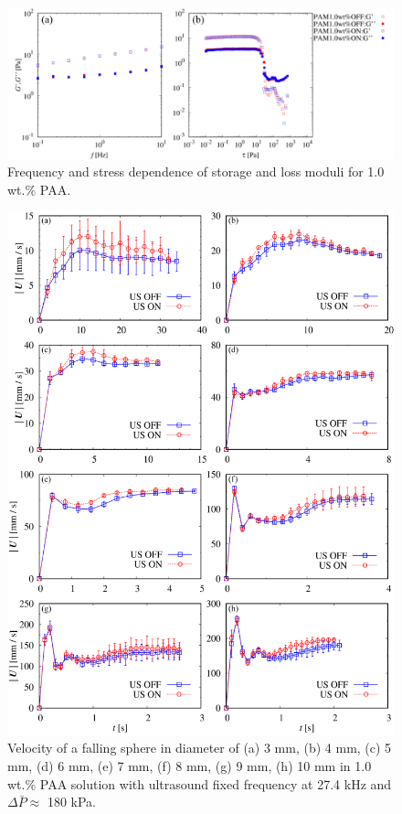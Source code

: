 \begin{figure}[ht]
    \includegraphics[width=15cm,clip]{5-Discussion/iwamuro-G.PNG}
    \caption{Frequency and stress dependence of storage and loss moduli for 1.0 wt.\% PAA.\cite{ref:8}}
    \label{fig:iwamuro-G}
\end{figure}

\begin{figure}[ht]
    \begin{center}
        \includegraphics[width=13cm,clip]{5-Discussion/iwamuro-fall.png}
    \caption{Velocity of a falling sphere in diameter of (a) 3 mm, (b) 4 mm, (c) 5 mm, (d) 6 mm, (e) 7 mm, (f) 8 mm, (g) 9 mm, (h) 10 mm in 1.0 wt.\% PAA solution with ultrasound fixed frequency at 27.4 kHz and $\Delta \bar{P} \approx$ 180 kPa\cite{ref:8}.}
    \label{fig:iwamuro-fall}
    \end{center}
\end{figure}

